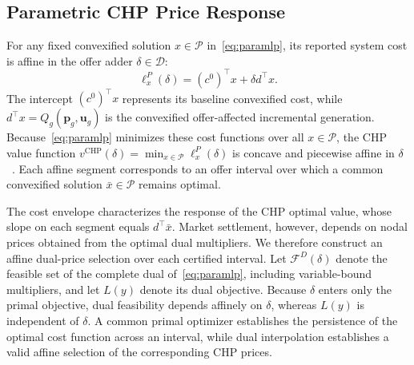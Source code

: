 \documentclass[journal]{IEEEtran}
\newcommand{\bp}{\bm p}
\newcommand{\bu}{\bm u}
\newcommand{\CHP}{\mathrm{CHP}}
\begin{document}
\subsection{Parametric CHP Price Response}
For any fixed convexified solution $x\in\mathcal{P}$ in~\eqref{eq:paramlp}, its reported system cost is affine in the offer adder $\delta\in\mathcal{D}$:
\begin{equation}
\ell_x^P(\delta) = (c^0)^\top x + \delta d^\top x.\label{eq:primal-line}
\end{equation}
The intercept $(c^0)^\top x$ represents its baseline convexified cost, while $d^\top x=Q_g(\bp_g,\bu_g)$ is the convexified offer-affected incremental generation. Because~\eqref{eq:paramlp} minimizes these cost functions over all $x\in\mathcal{P}$, the CHP value function $v^{\CHP}(\delta)=\min\nolimits_{x\in\mathcal{P}}\ell_x^P(\delta)$ is concave and piecewise affine in $\delta$~\cite{bertsimas1997}. Each affine segment corresponds to an offer interval over which a common convexified solution $\bar{x}\in\mathcal{P}$ remains optimal.

The cost envelope characterizes the response of the CHP optimal value, whose slope on each segment equals $d^\top\bar{x}$. Market settlement, however, depends on nodal prices obtained from the optimal dual multipliers. We therefore construct an affine dual-price selection over each certified interval. Let $\mathcal{F}^D(\delta)$ denote the feasible set of the complete dual of~\eqref{eq:paramlp}, including variable-bound multipliers, and let $L(y)$ denote its dual objective. Because $\delta$ enters only the primal objective, dual feasibility depends affinely on $\delta$, whereas $L(y)$ is independent of $\delta$. A common primal optimizer establishes the persistence of the optimal cost function across an interval, while dual interpolation establishes a valid affine selection of the corresponding CHP prices.
\end{document}
